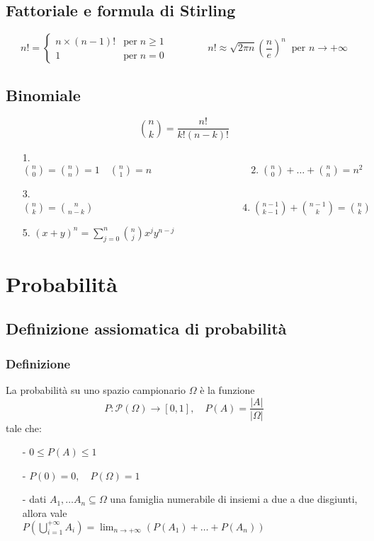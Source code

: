 \documentclass[a4paper]{article}
\begin{document}
\subsection*{Fattoriale e formula di Stirling}
\[n! = \begin{cases}
	n \times (n-1)! & \text{per} \; n \geq 1 \\
	1 & \text{per} \; n = 0
\end{cases} \qquad \qquad n! \approx \sqrt{2 \pi n} \left(\frac{n}{e}\right)^n \;\; \text{per } n \to +\infty\]

\subsection*{Binomiale}
\[\binom{n}{k} = \frac{n!}{k! (n-k)!}\]
\begin{itemize}
	\item[1.] \(\displaystyle \binom{n}{0} = \binom{n}{n} = 1 \quad \binom{n}{1} = n \qquad \qquad \qquad \qquad \qquad \text{2.} \; \binom{n}{0} + \dots + \binom{n}{n} = n^2\)
	\item[3.] \(\displaystyle \binom{n}{k} = \binom{n}{n-k} \qquad \qquad \qquad\qquad \qquad \qquad \qquad \quad \text{4.} \;\binom{n-1}{k-1} + \binom{n-1}{k} = \binom{n}{k}\)
	\item[5.] \(\displaystyle (x+y)^n = \sum_{j=0}^n \binom{n}{j} x^j y^{n-j}\)
\end{itemize}

\newpage


\section{Probabilità}
\subsection{Definizione assiomatica di probabilità}
\subsubsection*{Definizione}
La probabilità su uno spazio campionario \(\Omega\) è la funzione
\[\displaystyle P:\mathcal{P}(\Omega) \to [0,1], \quad P(A) = \frac{|A|}{|\Omega|}\]
tale che:
\begin{itemize}[topsep=3pt, itemsep=0pt]
	\item[-] \(0 \leq P(A)\leq 1\)
	\item[-] \(P(0) = 0, \quad P(\Omega) = 1\)
	\item[-] dati \(A_1, \dots A_n \subseteq \Omega\) una famiglia numerabile di insiemi a due a due disgiunti, allora vale \\
	\(\displaystyle P\left(\bigcup_{i=1}^{+\infty} A_i\right) = \lim_{n \to +\infty} (P(A_1) + \dots + P(A_n))\)
\end{itemize}
\end{document}
